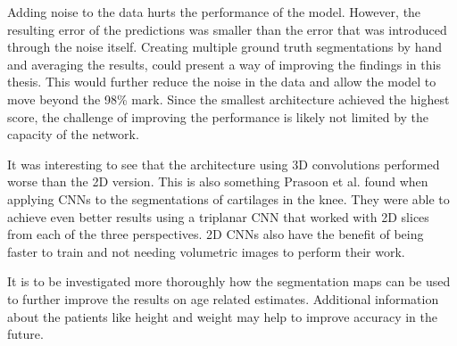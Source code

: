 Adding noise to the data hurts the performance of the model. However, the resulting error of the predictions was smaller than the error that was introduced through the noise itself. Creating multiple ground truth segmentations by hand and averaging the results, could present a way of improving the findings in this thesis. This would further reduce the noise in the data and allow the model to move beyond the 98\% mark. Since the smallest architecture achieved the highest score, the challenge of improving the performance is likely not limited by the capacity of the network.

 It was interesting to see that the architecture using 3D convolutions performed worse than the 2D version. This is also something Prasoon et al. \cite{Prasoon2013} found when applying CNNs to the segmentations of cartilages in the knee. They were able to achieve even better results using a triplanar CNN that worked with 2D slices from each of the three perspectives. 2D CNNs also have the benefit of being faster to train and not needing volumetric images to perform their work.

It is to be investigated more thoroughly how the segmentation maps can be used to further improve the results on age related estimates. Additional information about the patients like height and weight may help to improve accuracy in the future.

\newpage